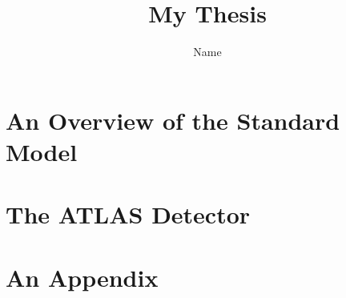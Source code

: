 \documentclass[thesis,openany]{./tex/thesis-umich}
\title{My Thesis}
\author{Name}
\begin{document}

\chapter{An Overview of the Standard Model} \label{chap:theory_chapter}
	 

\chapter{The ATLAS Detector} \label{chap:detector_chapter}
	 




\appendix

\chapter{An Appendix} \label{app:example_appendix}
	


 


\end{document}
